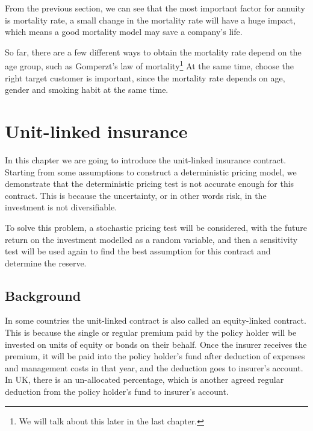 \documentclass{report}
\begin{document}
From the previous section, we can see that the most important factor for annuity is mortality rate, a small change in the mortality rate will have a huge impact, which means a good mortality model may save a company's life. 

So far, there are a few different ways to obtain the mortality rate depend on the age group, such as Gomperzt's law of mortality\footnote{We will talk about this later in the last chapter.} At the same time, choose the right target customer is important, since the mortality rate depends on age, gender and smoking habit at the same time.
















\chapter{Unit-linked insurance}     \label{unit-linked}



In this chapter we are going to introduce the unit-linked insurance contract. Starting from some assumptions to construct a deterministic pricing model, we demonstrate that the deterministic pricing test is not accurate enough for this contract.
This is because the uncertainty, or in other words risk, in the investment is not diversifiable.  

To solve this problem, a stochastic pricing test will be considered, with the future return on the investment modelled as a random variable, and then a sensitivity test will be used again to find the best assumption for this contract and determine the reserve. 


\section{Background}

In some countries the unit-linked contract is also called an equity-linked contract. This is because the single or regular premium paid by the policy holder will be invested on units of equity or bonds on their behalf. Once the insurer receives the premium, it will be paid into the policy holder's fund after deduction of expenses and management costs in that year, and the deduction goes to insurer's account. In UK, there is an un-allocated percentage, which is another agreed regular deduction from the policy holder's fund to insurer's account.
\end{document}
